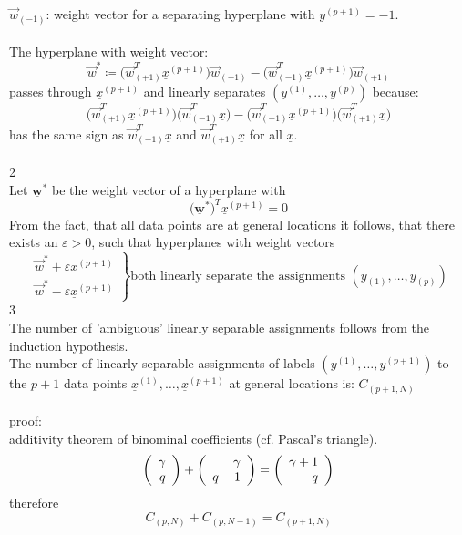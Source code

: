 $\vec{w}_{(-1)}$: weight vector for a separating hyperplane with $y^{(p + 1)} = -1$.\\\\
The hyperplane with weight vector:
\begin{equation}
	\vec{w}^* \coloneqq 
		\Big(\vec{w}_{(+1)}^T \underline{x}^{(p + 1)}
		\Big)\vec{w}_{(-1)} - 
		\Big(\vec{w}_{(-1)}^T \underline{x}^{(p + 1)}
		\Big)\vec{w}_{(+1)}
\end{equation}
passes through $\underline{x}^{(p + 1)}$ and linearly separates $(y^{(1)}, \ldots, y^{(p)})$ because:
\begin{equation}
	\Big(\vec{w}_{(+1)}^T \underline{x}^{(p + 1)}\Big)
	\Big(\vec{w}_{(-1)}^T \underline{x}\Big) -
	\Big(\vec{w}_{(-1)}^T \underline{x}^{(p + 1)}\Big)
	\Big(\vec{w}_{(+1)}^T \underline{x}\Big)
\end{equation}
has the same sign as $\vec{w}_{(-1)}^T \underline{x}$ and $\vec{w}_{(+1)}^T \underline{x}$ for all $\underline{x}$.\\\\
\textcircled{2}\\
Let $\mathbf{ \underline{w}^* }$ be the weight vector of a hyperplane with
\begin{equation}
	\big(\mathbf{ \underline{w}^* }\big)^T \underline{x}^{(p + 1)} = 0
\end{equation}
From the fact, that all data points are at general locations it follows, that there exists an $\varepsilon > 0$, such that hyperplanes with weight vectors
\begin{equation}
	\left.\begin{array}{ll}
	\vec{w}^* + \varepsilon \underline{x}^{(p + 1)}\\
	\vec{w}^* - \varepsilon \underline{x}^{(p + 1)}
	\end{array}\right\} 
	\textrm{both linearly separate the assignments } 
		(y_{(1)}, \ldots, y_{(p)})
\end{equation}
\textcircled{3}\\
The number of 'ambiguous' linearly separable assignments follows from the induction hypothesis.\\
The number of linearly separable assignments of labels $(y^{(1)}, \ldots, y^{(p + 1)})$ to the $p + 1$ data points $\underline{x}^{(1)}, \ldots, \underline{x}^{(p + 1)}$ at general locations is: $C_{(p + 1, N)}$\\\\
\underline{proof:}\\
additivity theorem of binominal coefficients (cf. Pascal's triangle).
\begin{equation}
	\left( \begin{array}{rrrrrrrrrrrrrrrrrrrrrrrrrr} \gamma\\q\\ \end{array} \right) + \left( \begin{array}{rrrrrrrrrrrrrrrrrrrrrrrrrr} \gamma\\q-1\\ \end{array} \right) = \left( \begin{array}{rrrrrrrrrrrrrrrrrrrrrrrrrr} \gamma+1\\q\\ \end{array} \right)
\end{equation}
therefore
\begin{equation}
	C_{(p, N)} + C_{(p, N - 1)} = C_{(p + 1, N)}
\end{equation}
